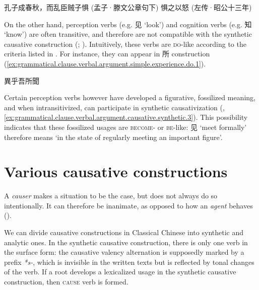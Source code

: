 \documentclass[UTF8, a4paper, oneside, scheme=plain, 12pt]{ctexrep}
\newcommand*{\citepage}[1]{p.~{#1}}
\newcommand*{\term}[1]{\emph{#1}}
\newcommand{\form}[1]{\emph{#1}}
\newcommand{\translate}[1]{`#1'}
\newcommand*{\category}[1]{\textsc{#1}}
\begin{document}
\begin{exe}
    \ex\label{ex:grammatical.clause.verbal.argument.simple.experience.1} 孔子成春秋，而乱臣贼子惧 (孟子·滕文公章句下)
    \ex\label{ex:grammatical.clause.verbal.argument.simple.experience.2} 惧之以怒 (左传·昭公十三年)
\end{exe}

On the other hand, perception verbs (e.g. 见 \translate{look}) and cognition verbs (e.g. 知 \translate{know})
are often transitive,
and therefore are not compatible with the synthetic causative construction 
(;
\citealt[\citepage{274}]{meiguang2018}).
Intuitively, these verbs are \category{do}-like according to the criteria listed in .
For instance, they can appear in 所 construction
(\ref{ex:grammatical.clause.verbal.argument.simple.experience.do.1}).

\begin{exe}
    \ex\label{ex:grammatical.clause.verbal.argument.simple.experience.do.1} 異乎吾所聞
\end{exe}

Certain perception verbs however have developed a figurative, fossilized meaning,
and when intransitivized, can participate in synthetic causativization
(,
\ref{ex:grammatical.clause.verbal.argument.causative.synthetic.3}).
This possibility indicates that these fossilized usages are \category{become}- or \category{be}-like:
见 \translate{meet formally} therefore means \translate{in the state of regularly meeting an important figure}.

\section{Various causative constructions}\label{sec:grammatical.clause.verbal.argument-structure.causative}

A \term{causer} makes a situation to be the case,
but does not always do so intentionally.
It can therefore be inanimate,
as opposed to how an \term{agent} behaves
().

We can divide causative constructions in Classical Chinese into
synthetic and analytic ones.
In the synthetic causative construction,
there is only one verb in the surface form:
the causative valency alternation is supposedly marked by a prefix \form{*s-},
which is invisible in the written texts but is reflected by tonal changes of the verb.
If a root develops a lexicalized usage in the synthetic causative construction,
then \category{cause} verb is formed.
\end{document}
